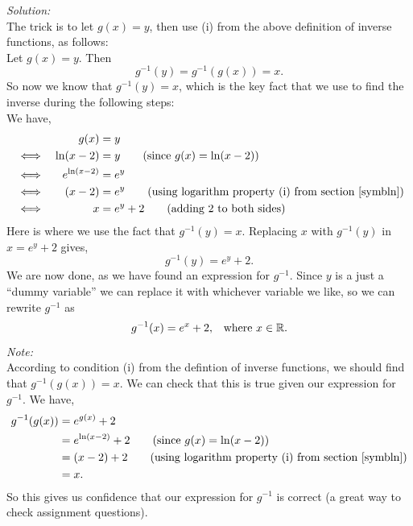 \noindent \textit{Solution:} \\
\noindent The trick is to let $g(x) = y$, then use (i) from the above definition of inverse functions, as follows: \\
\bigskip
\noindent Let $g(x) = y$. Then
\[
g^{-1}(y) = g^{-1}(g(x)) = x. \tag{by (i)}
\]
So now we know that $g^{-1}(y) = x$, which is the key fact that we use to find the inverse during the following steps: \\
We have,
\begin{alignat*}{2}
&& g(x) 
& = y \\
& \iff 
& \ln(x-2)  
& = y \tag{since $g(x) = \ln(x-2)$} \\
& \iff 
& e^{\ln(x - 2)} & = e^y \\
& \iff 
& (x-2) 
& = e^y \tag{using logarithm property (i) from section \ref{symbln}} \\
& \iff
& x
& = e^y + 2 \tag{adding $2$ to both sides}
\end{alignat*}
Here is where we use the fact that $g^{-1}(y) = x$. Replacing $x$ with $g^{-1}(y)$ in $x = e^y + 2$ gives,
\[
g^{-1}(y) = e^y + 2.
\]
We are now done, as we have found an expression for $g^{-1}$.
Since $y$ is a just a ``dummy variable'' we can replace it with whichever variable we like, so we can rewrite $g^{-1}$ as
\[
g^{-1}(x) = e^x + 2, \;\;\; \text{where $x \in \mathbb{R}$.}
\]
\bigskip
\textit{Note:} \\
According to condition (i) from the defintion of inverse functions, we should find that $g^{-1}(g(x)) = x$. We can check that this is true given our expression for $g^{-1}$. We have,
\begin{align*}
g^{-1}(g(x)) & = e^{g(x)} + 2 \\
		     & = e^{\ln(x-2)} + 2 \tag{since $g(x) = \ln(x-2)$} \\
		     & = (x - 2) + 2 \tag{using logarithm property (i) from section \ref{symbln}} \\
		     & = x.
\end{align*}
So this gives us confidence that our expression for $g^{-1}$ is correct (a great way to check assignment questions).

